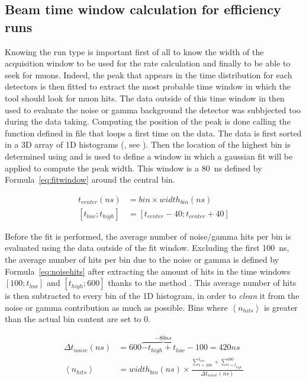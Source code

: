 	\subsection{Beam time window calculation for efficiency runs}
	\label{app2:ssec:beamwindow}
	
	Knowing the run type is important first of all to know the width of the acquisition window to be used for the rate calculation and finally to be able to seek for muons. Indeed, the peak that appears in the time distribution for each detectors is then fitted to extract the most probable time window in which the tool should look for muon hits. The data outside of this time window in then used to evaluate the noise or gamma background the detector was subbjected too during the data taking. Computing the position of the peak is done calling the function  defined in file  that loops a first time on the data. The data is first sorted in a 3D array of 1D histograms (, see ). Then the location of the highest bin is determined using  and is used to define a window in which a gaussian fit will be applied to compute the peak width. This window is a \SI{80}{ns} defined by Formula~\ref{eq:fitwindow} around the central bin.
	
	\begin{subequations}
	\label{eq:fitwindow}
	\begin{align}
		t_{center}(ns) & = bin \times width_{bin}(ns)\\
		[t_{low};t_{high}] & = [t_{center} - 40; t_{center} + 40]
	\end{align}
	\end{subequations}
	
	Before the fit is performed, the average number of noise/gamma hits per bin is evaluated using the data outside of the fit window. Excluding the first \SI{100}{ns}, the average number of hits per bin due to the noise or gamma is defined by Formula~\ref{eq:noisehits} after extracting the amount of hits in the time windows $[100;t_{low}]$ and $[t_{high};600]$ thanks to the method . This average number of hits is then subtracted to every bin of the 1D histogram, in order to \textit{clean} it from the noise or gamma contribution as much as possible. Bins where $\left\langle n_{hits} \right\rangle$ is greater than the actual bin content are set to 0.
	
	\begin{subequations}
	\label{eq:noisehits}
	\begin{align}
		\Delta t_{noise}(ns) & = 600 \overbrace{- t_{high} + t_{low}}^{-80ns} - 100 = 420ns \\
		\left\langle n_{hits} \right\rangle & = width_{bin}(ns) \times \frac{\sum_{t=100}^{t_{low}}+\sum_{t=t_{high}}^{600}}{\Delta t_{noise}(ns)}
	\end{align}
	\end{subequations}
	
